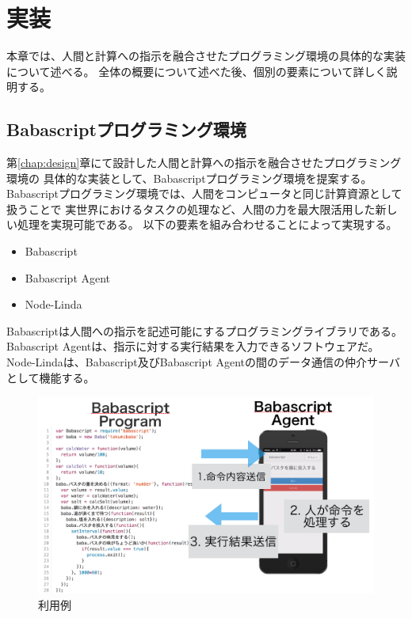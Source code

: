 \chapter{実装}\label{chap:implementation}

本章では、人間と計算への指示を融合させたプログラミング環境の具体的な実装について述べる。
全体の概要について述べた後、個別の要素について詳しく説明する。

\newpage

\section{Babascriptプログラミング環境}\label{babascriptux30d7ux30edux30b0ux30e9ux30dfux30f3ux30b0ux74b0ux5883}

第\ref{chap:design}章にて設計した人間と計算への指示を融合させたプログラミング環境の
具体的な実装として、Babascriptプログラミング環境を提案する。
Babascriptプログラミング環境では、人間をコンピュータと同じ計算資源として扱うことで
実世界におけるタスクの処理など、人間の力を最大限活用した新しい処理を実現可能である。
以下の要素を組み合わせることによって実現する。

\begin{itemize}
\itemsep1pt\parskip0pt
\item
  Babascript
\item
  Babascript Agent
\item
  Node-Linda
\end{itemize}

Babascriptは人間への指示を記述可能にするプログラミングライブラリである。
Babascript Agentは、指示に対する実行結果を入力できるソフトウェアだ。
Node-Lindaは、Babascript及びBabascript
Agentの間のデータ通信の仲介サーバとして機能する。

\begin{figure}[htbp]
  \begin{center}
  \includegraphics[width=.7\linewidth,bb=0 0 1007 592]{images/overview-using.png}
  \end{center}
  \caption{利用例}
  \label{fig:overview_using}
\end{figure}

